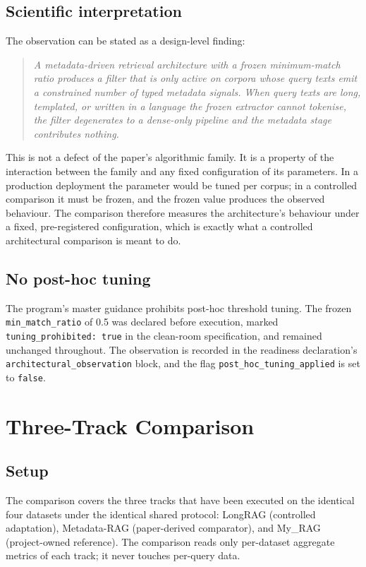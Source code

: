 \documentclass[11pt,a4paper]{article}
\begin{document}
\subsection{Scientific interpretation}
The observation can be stated as a design-level finding:

\begin{quote}
\emph{A metadata-driven retrieval architecture with a frozen
minimum-match ratio produces a filter that is only active on corpora
whose query texts emit a constrained number of typed metadata
signals. When query texts are long, templated, or written in a
language the frozen extractor cannot tokenise, the filter
degenerates to a dense-only pipeline and the metadata stage
contributes nothing.}
\end{quote}

This is not a defect of the paper's algorithmic family. It is a
property of the interaction between the family and any fixed
configuration of its parameters. In a production deployment the
parameter would be tuned per corpus; in a controlled comparison it
must be frozen, and the frozen value produces the observed
behaviour. The comparison therefore measures the architecture's
behaviour under a fixed, pre-registered configuration, which is
exactly what a controlled architectural comparison is meant to do.

\subsection{No post-hoc tuning}
The program's master guidance prohibits post-hoc threshold tuning.
The frozen \texttt{min\_match\_ratio} of \num{0.5} was declared
before execution, marked \texttt{tuning\_prohibited: true} in the
clean-room specification, and remained unchanged throughout. The
observation is recorded in the readiness declaration's
\texttt{architectural\_observation} block, and the flag
\texttt{post\_hoc\_tuning\_applied} is set to \texttt{false}.

\section{Three-Track Comparison}\label{sec:comparison}

\subsection{Setup}
The comparison covers the three tracks that have been executed on
the identical four datasets under the identical shared protocol:
LongRAG (controlled adaptation), Metadata-RAG (paper-derived
comparator), and My\_RAG (project-owned reference). The comparison
reads only per-dataset aggregate metrics of each track; it never
touches per-query data.
\end{document}

